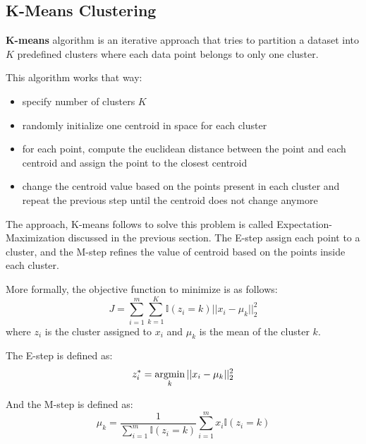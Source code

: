 \documentclass[12pt]{report}
\newcommand{\argmin}{\operatornamewithlimits{argmin}}
\begin{document}
    
        \subsection{K-Means Clustering}
            \textbf{K-means} algorithm is an iterative approach that tries to partition a dataset into $K$ predefined clusters where each data point belongs to only one cluster. 
            
            This algorithm works that way:
            \begin{itemize}
                \item specify number of clusters $K$
                \item randomly initialize one centroid in space for each cluster
                \item for each point, compute the euclidean distance between the point and each centroid and assign the point to the closest centroid
                \item change the centroid value based on the points present in each cluster and repeat the previous step until the centroid does not change anymore
            \end{itemize}
            
            The approach, K-means follows to solve this problem is called Expectation-Maximization discussed in the previous section. The E-step assign each point to a cluster, and the M-step refines the value of centroid based on the points inside each cluster.
            
            More formally, the objective function to minimize is as follows:
            \begin{equation}
                J = \sum_{i=1}^{m} \sum_{k=1}^{K} \mathbb{I}(z_i = k)||x_i - \mu_k||_2^2
            \end{equation}
            where $z_i$ is the cluster assigned to $x_i$ and $\mu_k$ is the mean of the cluster $k$.
            
            The E-step is defined as:
            \begin{equation}
                z_i^{*} = \argmin_{k} ||x_i - \mu_k||_2^2
            \end{equation}
            
            And the M-step is defined as:
            \begin{equation}
                \mu_k = \frac{1}{\sum_{i=1}^m \mathbb{I}(z_i = k)} \sum_{i=1}^m  x_i\mathbb{I}(z_i = k)
            \end{equation}
            
\end{document}
